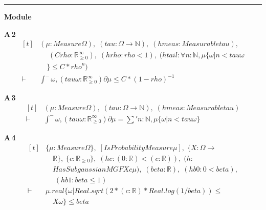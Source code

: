 \vspace{4pt}\noindent\rule{\columnwidth}{0.4pt}\par\vspace{2pt}
\noindent\textbf{Module }\par\vspace{3pt}

\noindent\textbf{A\,2}\quad{}
{\footnotesize\[ \begin{aligned}[t]
&(\mu : \mathit{Measure} \Omega ),\; (\mathit{tau} : \Omega \to \mathbb{N} ),\; (\mathit{hmeas} : \mathit{Measurable} \mathit{tau}),\\
&\quad \; (\mathit{C} \mathit{rho} : \mathbb{R}_{\geq0}^{\infty} ),\; (\mathit{hrho} : \mathit{rho} < 1),\; (\mathit{htail} : \forall \mathit{n} : \mathbb{N} , \mu \{ \omega | \mathit{n} < \mathit{tau} \omega\\
&\quad \} \leq \mathit{C} * \mathit{rho} ^{\mathit{n}})\\
\vdash\;&\int^{-} \omega , (\mathit{tau} \omega : \mathbb{R}_{\geq0}^{\infty} ) ∂\mu \leq \mathit{C} * (1 - \mathit{rho})^{-1}
\end{aligned} \]}

\noindent\textbf{A\,3}\quad{}
{\footnotesize\[ \begin{aligned}[t]
&(\mu : \mathit{Measure} \Omega ),\; (\mathit{tau} : \Omega \to \mathbb{N} ),\; (\mathit{hmeas} : \mathit{Measurable} \mathit{tau})\\
\vdash\;&\int^{-} \omega , (\mathit{tau} \omega : \mathbb{R}_{\geq0}^{\infty} ) ∂\mu = \textstyle\sum ' \mathit{n} : \mathbb{N} , \mu \{ \omega | \mathit{n} < \mathit{tau} \omega \}
\end{aligned} \]}

\noindent\textbf{A\,4}\quad{}
{\footnotesize\[ \begin{aligned}[t]
&\{ \mu : \mathit{Measure} \Omega \},\; [\mathit{IsProbabilityMeasure} \mu ],\; \{ \mathit{X} : \Omega \to\\
&\quad \mathbb{R} \},\; \{ \mathit{c} : \mathbb{R}_{\geq0} \},\; (\mathit{hc} : (0:\mathbb{R} ) < (\mathit{c} : \mathbb{R} )),\; (\mathit{h} :\\
&\quad \mathit{HasSubgaussianMGF} \mathit{X} \mathit{c} \mu ),\; (\mathit{beta} : \mathbb{R} ),\; (\mathit{hb0} : 0 < \mathit{beta}),\\
&\quad \; (\mathit{hb1} : \mathit{beta} \leq 1)\\
\vdash\;&\mu .\mathit{real} \{ \omega | \mathit{Real}.\mathit{sqrt} (2 * (\mathit{c} : \mathbb{R} ) * \mathit{Real}.\mathit{log} (1 / \mathit{beta})) \leq\\
&\quad \mathit{X} \omega \} \leq \mathit{beta}
\end{aligned} \]}

